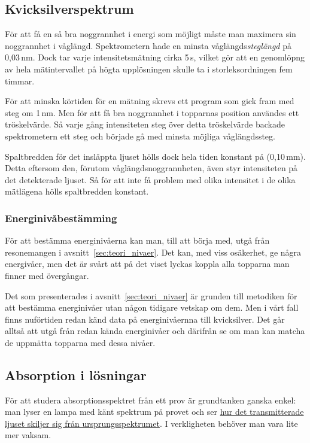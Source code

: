 \documentclass[11pt,a4paper]{article}
\begin{document}
\subsection{Kvicksilverspektrum}
För att få en så bra noggrannhet i energi som möjligt måste man
maximera sin noggrannhet i våglängd. Spektrometern hade en minsta
våglängds\emph{steglängd}\footnotemark{} på 0,03\,nm. Dock tar varje
intensitetsmätning cirka 5\,s, vilket gör att en
genomlöpng av hela mätintervallet på högta upplösningen skulle ta i
storleksordningen fem timmar. 

För att minska körtiden för en mätning skrevs ett program som gick
fram med steg om 1\,nm. Men för att få bra noggrannhet i topparnas
position användes ett tröskelvärde. Så varje gång intensiteten steg
över detta tröskelvärde backade spektrometern ett steg och började gå
med minsta möjliga våglängdssteg. 

Spaltbredden för det insläppta ljuset hölls dock hela tiden
konstant på (0,10\,mm). Detta eftersom den, förutom
våglängdsnoggrannheten, även styr intensiteten på det detekterade
ljuset. Så för att inte få problem med olika intensitet i de olika
mätlägena hölls spaltbredden konstant. 

\subsubsection{Energinivåbestämming}
För att bestämma energinivåerna kan man, till att börja med, utgå från
resonemangen i avsnitt~\ref{sec:teori_nivaer}. Det kan, med viss
osäkerhet, ge några energivåer, men det är svårt att på det viset
lyckas koppla alla topparna man finner med övergångar. 

Det som presenterades i avsnitt~\ref{sec:teori_nivaer} är grunden till
metodiken för att bestämma energinivåer utan någon tidigare vetskap om
dem. Men i vårt fall finns nuförtiden redan känd data på
energinivåernna till kvicksilver. Det går alltså att utgå från redan
kända energinivåer och därifrån se om man kan matcha de uppmätta
topparna med dessa nivåer. 


\subsection{Absorption i lösningar}

För att studera absorptionsspektret från ett prov är grundtanken
ganska enkel: man lyser en lampa med känt spektrum på provet och ser
\href{https://xkcd.com/1517/}{hur det transmitterade ljuset skiljer
  sig från ursprungsspektrumet}. I verkligheten behöver man vara lite
mer vaksam. 
\end{document}
